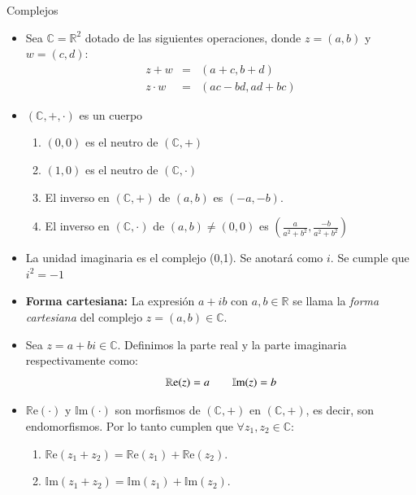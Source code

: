 \documentclass[letterpaper,10pt]{article}
\newcommand{\R}{\mathbb R}
\newcommand{\re}{\mathbb R \text{e}}
\newcommand{\im}{\mathbb I \text{m}}
\newcommand{\C}{\mathbb C}
\theoremstyle{plain}
\begin{document}
\newpage
\begin{framed} Complejos
	\begin{multicols}{2}
	    \begin{itemize}
	        \item Sea $\C=\R^2$ dotado de las siguientes operaciones, donde $z=(a,b)$ y $w=(c,d)$:
            	$$
            	\begin{array}{rcl}
            	z+w & = & (a+c, b+d) \\
            	z \cdot w & = & (ac - bd , ad+bc) 
            	\end{array}
            	$$
        	\item $(\C,+,\cdot)$ es un cuerpo
            	\begin{enumerate}
            	    \item $(0,0)$ es el neutro de $(\C,+)$
            	    \item $(1,0)$ es el neutro de $(\C,\cdot)$
            	    \item El inverso en $(\C,+)$ de $(a,b)$ es $(-a,-b)$.
            	    \item El inverso en $(\C,\cdot)$ de $(a,b)\neq(0,0)$ es $(\frac{a}{a^2+b^2},\frac{-b}{a^2+b^2})$
            	\end{enumerate} 
	
        	\item La unidad imaginaria es el complejo (0,1). Se anotará como $i$. Se cumple que $i^2=-1$
        	\item \textbf{Forma cartesiana: }La expresión $a+ib$ con $a,b\in \R$ se llama la \textit{forma cartesiana} del complejo $z=(a,b)\in \C$.
            \item Sea $z=a+bi\in \C$. Definimos la parte real y la parte imaginaria respectivamente como:
            $$
            \re(z)=a \hspace{7 mm} \im(z)=b
            $$
            
            \item $\re(\cdot)$ y $\im(\cdot)$ son morfismos de $(\C,+)$ en $(\C,+)$, es decir, son endomorfismos. Por lo tanto cumplen que $\forall z_1,z_2 \in \C$:
                \begin{enumerate}
                    \item $\re(z_1+z_2)=\re(z_1)+\re(z_2)$.
                    \item $\im(z_1+z_2)=\im(z_1)+\im(z_2)$.
                \end{enumerate}
            

\end{itemize}
\end{multicols}
\end{framed}
\end{document}
